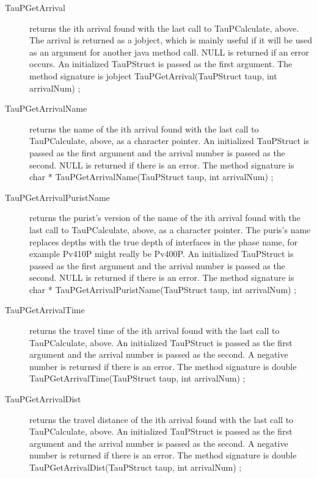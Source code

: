\begin{center}
\begin{description}
\item[TauPGetArrival] returns the ith arrival found with the last
call to TauPCalculate, above. The arrival is returned as a jobject, which
is mainly useful if it will be used as an argument for another java method
call. NULL is returned if an
error occurs. An initialized TauPStruct is passed as the first argument.
The method signature is\newline
jobject TauPGetArrival(TauPStruct taup, int arrivalNum) {};

\item[TauPGetArrivalName] returns the name of the ith arrival
found with the last call to TauPCalculate, above, as a
character pointer. An initialized TauPStruct is passed as the
first argument and the arrival number is passed as the second.
NULL is returned if there is an error.
The method signature is\newline
char * TauPGetArrivalName(TauPStruct taup, int arrivalNum) {};

\item[TauPGetArrivalPuristName] returns the purist's version of the
name of the ith arrival
found with the last call to TauPCalculate, above, as a
character pointer. The puris's name replaces depths with the true depth
of interfaces in the phase name, for example Pv410P might really be
Pv400P.
An initialized TauPStruct is passed as the
first argument and the arrival number is passed as the second.
NULL is returned if there is an error.
The method signature is\newline
char * TauPGetArrivalPuristName(TauPStruct taup, int arrivalNum) {};

\item[TauPGetArrivalTime] returns the travel time of the ith arrival
found with the last call to TauPCalculate, above.
An initialized TauPStruct is passed as the first argument and
the arrival number is passed as the second.
A negative number is returned if there is an error.
The method signature is\newline
double TauPGetArrivalTime(TauPStruct taup, int arrivalNum) {};

\item[TauPGetArrivalDist] returns the travel distance of the ith arrival
found with the last call to TauPCalculate, above.
An initialized TauPStruct is passed as the first argument and
the arrival number is passed as the second.
A negative number is returned if there is an error.
The method signature is\newline
double TauPGetArrivalDist(TauPStruct taup, int arrivalNum) {};


\end{description}
\end{center}
